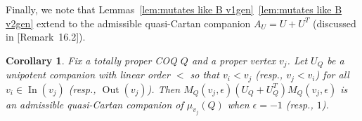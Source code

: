 \documentclass[11pt, letterpaper]{amsart}
\newcommand{\cS}[1]{{\noindent\textsf{\color{purple}$\blacksquare$~#1~$\blacksquare$}}}
\newtheorem{corollary}[theorem]{Corollary}
\theoremstyle{definition}
\numberwithin{equation}{section}
\def\In{{\operatorname{In}}}
\def\Out{{\operatorname{Out}}}
\begin{document}
Finally, we note that Lemmas~\ref{lem:mutates like B v1gen}~\ref{lem:mutates like B v2gen} extend to the admissible quasi-Cartan companion $A_U= U + U^T$ (discussed in \cite{COQ}[Remark~16.2]). 

\begin{corollary}
\label{cor:A mutates like B}
Fix a totally proper COQ $Q$ and a proper vertex $v_j$.
Let $U_Q$ be a unipotent companion with linear order $<$ so that $v_i < v_j$ (resp., $v_j < v_i$) for all $v_i \in \In(v_j)$ (resp., $\Out(v_j)$).
Then $M_Q(v_j, \epsilon) (U_Q + U_Q^T) M_Q(v_j, \epsilon)$ %
is an admissible quasi-Cartan companion of $\mu_{v_j}(Q)$ when $\epsilon = -1$ (resp., $1$).
\end{corollary}
\vspace{-0.4cm}
\end{document}
